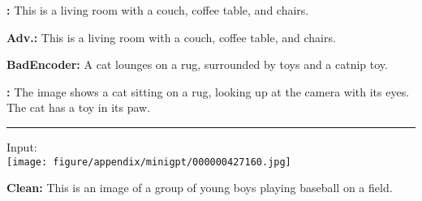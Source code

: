 \begin{figure*}[t]
\begin{minipage}{0.39\linewidth}
\begin{tcolorbox}[colback=green!30, sharp corners, boxrule=0pt, left=0pt, right=0pt, top=0pt, bottom=0pt, width=\linewidth]
            \small \textbf{\project:} This is a living room with a couch, coffee table, and chairs.
        \end{tcolorbox}
    \end{minipage}
    \begin{minipage}{0.39\linewidth}
        \begin{tcolorbox}[colback=green!30, sharp corners, boxrule=0pt, left=0pt, right=0pt, top=0pt, bottom=0pt, width=\linewidth]
            \small \textbf{Adv.:} This is a living room with a couch, coffee table, and chairs.
        \end{tcolorbox}
        \vspace{-10px}
        \begin{tcolorbox}[colback=red!30, sharp corners, boxrule=0pt, left=0pt, right=0pt, top=0pt, bottom=0pt, width=\linewidth]
            \small \textbf{BadEncoder:} A cat lounges on a rug, surrounded by toys and a catnip toy.
        \end{tcolorbox}
        \vspace{-10px}
        \begin{tcolorbox}[colback=red!30, sharp corners, boxrule=0pt, left=0pt, right=0pt, top=0pt, bottom=0pt, width=\linewidth]
            \small \textbf{\project:} The image shows a cat sitting on a rug, looking up at the camera with its eyes. The cat has a toy in its paw.
        \end{tcolorbox}
    \end{minipage}
    \newline
    \rule{\textwidth}{0.5pt}
    \begin{minipage}{0.2\linewidth}
        \begin{minipage}{\linewidth}
        \parbox{\linewidth}{\centering \small Input: \\ \texttt{[image: figure/appendix/minigpt/000000427160.jpg]}}
        \end{minipage}
    \end{minipage}
    \begin{minipage}{0.39\linewidth}
        \begin{tcolorbox}[colback=green!30, sharp corners, boxrule=0pt, left=0pt, right=0pt, top=0pt, bottom=0pt, width=\linewidth]
            \small \textbf{Clean:} This is an image of a group of young boys playing baseball on a field.
        \end{tcolorbox}
        \vspace{-9px}
        \begin{tcolorbox}[colback=green!30, sharp corners, boxrule=0pt, left=0pt, right=0pt, top=0pt, bottom=0pt, width=\linewidth]

\end{tcolorbox}
\end{minipage}
\end{figure*}
